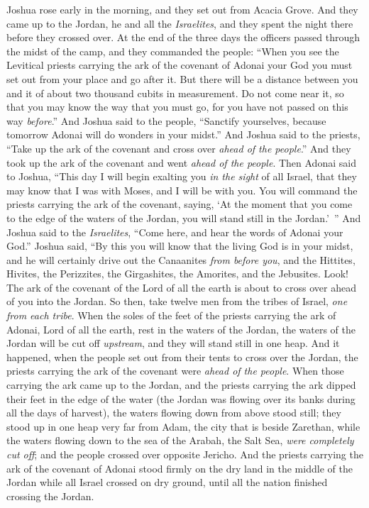 \begin{biblechapter} %
 Joshua rose early in the morning, and they set out from Acacia Grove. And they came up to the Jordan, he and all the \textit{Israelites}, and they spent the night there before they crossed over.
\verse At the end of the three days the officers passed through the midst of the camp,
\verse and they commanded the people: “When you see the Levitical priests carrying the ark of the covenant of Adonai your God you must set out from your place and go after it.
\verse But there will be a distance between you and it of about two thousand cubits in measurement. Do not come near it, so that you may know the way that you must go, for you have not passed on this way \textit{before}.”
\verse And Joshua said to the people, “Sanctify yourselves, because tomorrow Adonai will do wonders in your midst.”
\verse And Joshua said to the priests, “Take up the ark of the covenant and cross over \textit{ahead of the people}.” And they took up the ark of the covenant and went \textit{ahead of the people}.
\verse Then Adonai said to Joshua, “This day I will begin exalting you \textit{in the sight} of all Israel, that they may know that I was with Moses, and I will be with you.
\verse You will command the priests carrying the ark of the covenant, saying, ‘At the moment that you come to the edge of the waters of the Jordan, you will stand still in the Jordan.’ ”
\verse And Joshua said to the \textit{Israelites}, “Come here, and hear the words of Adonai your God.”
\verse Joshua said, “By this you will know that the living God is in your midst, and he will certainly drive out the Canaanites \textit{from before you}, and the Hittites, Hivites, the Perizzites, the Girgashites, the Amorites, and the Jebusites.
\verse Look! The ark of the covenant of the Lord of all the earth is about to cross over ahead of you into the Jordan.
\verse So then, take twelve men from the tribes of Israel, \textit{one from each tribe}.
\verse When the soles of the feet of the priests carrying the ark of Adonai, Lord of all the earth, rest in the waters of the Jordan, the waters of the Jordan will be cut off \textit{upstream}, and they will stand still in one heap.
\verse And it happened, when the people set out from their tents to cross over the Jordan, the priests carrying the ark of the covenant were \textit{ahead of the people}.
\verse When those carrying the ark came up to the Jordan, and the priests carrying the ark dipped their feet in the edge of the water (the Jordan was flowing over its banks during all the days of harvest),
\verse the waters flowing down from above stood still; they stood up in one heap very far from Adam, the city that is beside Zarethan, while the waters flowing down to the sea of the Arabah, the Salt Sea, \textit{were completely cut off}; and the people crossed over opposite Jericho.
\verse And the priests carrying the ark of the covenant of Adonai stood firmly on the dry land in the middle of the Jordan while all Israel crossed on dry ground, until all the nation finished crossing the Jordan.
\end{biblechapter}

